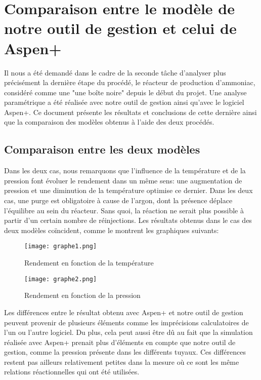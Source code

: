 
\section*{Comparaison entre le modèle de notre outil de gestion et celui de Aspen+}
Il nous a été demandé dans le cadre de la seconde tâche d'analyser plus précisément la dernière étape du procédé, le réacteur de production d'ammoniac, considéré comme une "une boîte noire" depuis le début du projet. Une analyse paramétrique a été réalisée avec notre outil de gestion ainsi qu'avec le logiciel Aspen+. Ce document présente les résultats et conclusions de cette dernière ainsi que la comparaison des modèles obtenus à l'aide des deux procédés.


\subsection*{Comparaison entre les deux modèles}
Dans les deux cas, nous remarquons que l'influence de la température et de la pression font évoluer le rendement dans un même sens: une augmentation de pression et une diminution de la température optimise ce dernier.
Dans les deux cas, une purge est obligatoire à cause  de l'argon, dont la présence déplace l'équilibre au sein du réacteur. Sans quoi, la réaction ne serait plus possible à partir d'un certain nombre de réinjections. Les résultats obtenus dans le cas des deux modèles coïncident, comme le montrent les graphiques suivants:

\begin{figure}[ht!]
 \centering
 \texttt{[image: graphe1.png]}
 \caption{Rendement en fonction de la température}
 \label{scheme}
\end{figure}

\begin{figure}[ht!]
 \centering
 \texttt{[image: graphe2.png]}
 \caption{Rendement en fonction de la pression}
 \label{scheme}
\end{figure}

Les différences entre le résultat obtenu avec Aspen+ et notre outil de gestion peuvent provenir de plusieurs éléments comme les imprécisions calculatoires de l'un ou l'autre logiciel. Du plus, cela peut aussi être dû au fait que la simulation réalisée avec Aspen+ prenait plus d'éléments en compte que notre outil de gestion, comme la pression présente dans les différents tuyaux. Ces différences restent pas ailleurs relativement petites dans la mesure où ce sont les même relations réactionnelles qui ont été utilisées.


